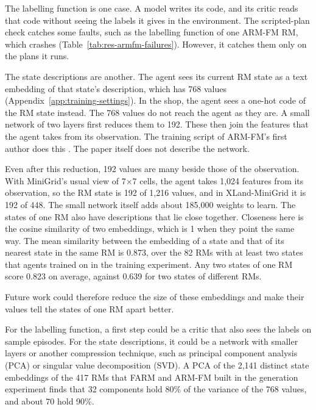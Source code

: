 \documentclass[11pt,english,listoffigures,listoftables]{tfgetsinf}
\begin{document}
The labelling function is one case. A model writes its code, and its critic reads that code without seeing the labels it gives in the environment. The scripted-plan check catches some faults, such as the labelling function of one ARM-FM RM, which crashes (Table~\ref{tab:res-armfm-failures}). However, it catches them only on the plans it runs. 

The state descriptions are another. The agent sees its current RM state as a text embedding of that state's description, which has 768 values (Appendix~\ref{app:training-settings}). In the shop, the agent sees a one-hot code of the RM state instead. The 768 values do not reach the agent as they are. A small network of two layers first reduces them to 192. These then join the features that the agent takes from its observation. The training script of ARM-FM's first author does this \cite{armfm_code}. The paper itself does not describe the network.

Even after this reduction, 192 values are many beside those of the observation. With MiniGrid's usual view of 7$\times$7 cells, the agent takes 1,024 features from its observation, so the RM state is 192 of 1,216 values, and in XLand-MiniGrid it is 192 of 448. The small network itself adds about 185,000 weights to learn. The states of one RM also have descriptions that lie close together. Closeness here is the cosine similarity of two embeddings, which is 1 when they point the same way. The mean similarity between the embedding of a state and that of its nearest state in the same RM is 0.873, over the 82 RMs with at least two states that agents trained on in the training experiment. Any two states of one RM score 0.823 on average, against 0.639 for two states of different RMs.

Future work could therefore reduce the size of these embeddings and make their values tell the states of one RM apart better.

For the labelling function, a first step could be a critic that also sees the labels on sample episodes. For the state descriptions, it could be a network with smaller layers or another compression technique, such as principal component analysis (PCA) or singular value decomposition (SVD). A PCA of the 2,141 distinct state embeddings of the 417 RMs that FARM and ARM-FM built in the generation experiment finds that 32 components hold 80\% of the variance of the 768 values, and about 70 hold 90\%.

\end{document}
